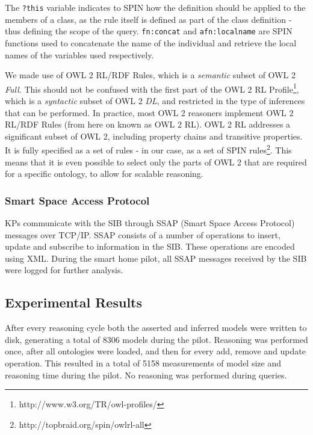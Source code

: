The \texttt{?this} variable indicates to SPIN how the definition should be applied to the members of a class, as the rule itself is defined as part of the class definition - thus defining the scope of the query. \texttt{fn:concat} and \texttt{afn:localname} are SPIN functions used to concatenate the name of the individual and retrieve the local names of the variables used respectively.


We made use of OWL 2 RL/RDF Rules, which is a \emph{semantic} subset of OWL 2 \emph{Full}. This should not be confused with the first part of the OWL 2 RL Profile\footnote{http://www.w3.org/TR/owl-profiles/}, which is a \emph{syntactic} subset of OWL 2 \emph{DL}, and restricted in the type of inferences that can be performed. In practice, most OWL 2 reasoners implement OWL 2 RL/RDF Rules (from here on known as OWL 2 RL). OWL 2 RL addresses a significant subset of OWL 2, including property chains and transitive properties. It is fully specified as a set of rules - in our case, as a set of SPIN rules\footnote{ http://topbraid.org/spin/owlrl-all}. This means that it is even possible to select only the parts of OWL 2 that are required for a specific ontology, to allow for scalable reasoning.

\subsubsection{Smart Space Access Protocol}

KPs communicate with the SIB through SSAP (Smart Space Access Protocol) messages \cite{Honkola2010} over TCP/IP. SSAP consists of a number of operations to insert, update and subscribe to information in the SIB. These operations are encoded using XML. During the smart home pilot, all SSAP messages received by the SIB were logged for further analysis.

\subsection{Experimental Results}
\label{results}

After every reasoning cycle both the asserted and inferred models were written to disk, generating a total of 8306 models during the pilot. Reasoning was performed once, after all ontologies were loaded, and then for every add, remove and update operation. This resulted in a total of 5158 measurements of model size and reasoning time during the pilot. No reasoning was performed during queries.

